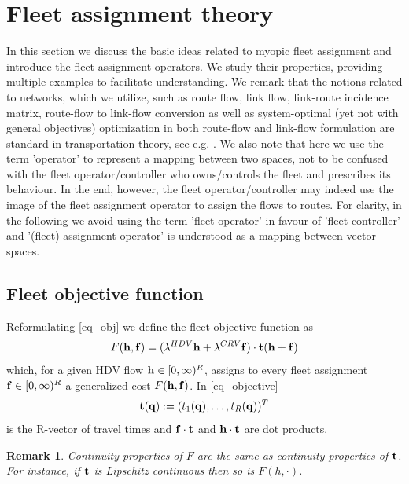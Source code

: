 \documentclass[a4paper,11pt]{article}
\newtheorem{remark}[theorem]{Remark}
\begin{document}
\section{Fleet assignment theory}

\label{Sec_Inverse}

In this section we discuss the basic ideas related to myopic fleet assignment and introduce the fleet assignment operators. We study their properties, providing multiple examples to facilitate understanding. We remark that the notions related to networks, which we utilize, such as route flow, link flow, link-route incidence matrix, route-flow to link-flow conversion as well as system-optimal (yet not with general objectives) optimization in both route-flow and link-flow formulation are standard in transportation theory, see e.g. \cite{CascettaBook, BoylesBook}.
We also note that here we use the term 'operator' to represent a mapping between two spaces, not to be confused with the fleet operator/controller who owns/controls the fleet and prescribes its behaviour. In the end, however, the fleet operator/controller may indeed use the image of the fleet assignment operator to assign the flows to routes. For clarity, in the following we avoid using the term 'fleet operator' in favour of 'fleet controller' and '(fleet) assignment operator' is understood as a mapping between vector spaces. 

\subsection{\bf Fleet objective function}
\noindent Reformulating \eqref{eq_obj} we define the fleet objective function as 
\begin{equation}
\label{eq_objective}
F(\bold{h}, \bold{f}) = (\lambda^{HDV}\bold{h} + \lambda^{CRV}\bold{f})\cdot \bold{t}(\bold{h} + \bold{f})
\end{equation}
which, for a given HDV flow $\bold{h} \in [0,\infty)^R$, assigns to every fleet assignment $\bold{f} \in [0,\infty)^R$ a generalized cost $F(\bold{h}, \bold{f})$. In \eqref{eq_objective}
$$\bold{t}(\bold{q}) := (t_1(\bold{q}), \dots, t_R(\bold{q}))^T$$
is the R-vector of travel times
and $\bold{f}\cdot \bold{t}$ and $\bold{h}\cdot \bold{t}$ are dot products.

\begin{remark}
\label{Rem_continuity}
Continuity properties of $F$ are the same as continuity properties of $\bold{t}$. For instance, if $\bold{t}$ is Lipschitz continuous then so is $F(h,\cdot)$. 
\end{remark}
\end{document}
